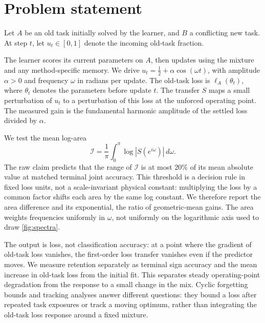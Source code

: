 \section{Problem statement}
\label{sec:problem}

Let \(A\) be an old task initially solved by the learner, and \(B\) a conflicting new task. At step \(t\), let \(u_t\in[0,1]\) denote the incoming old-task fraction.

The learner scores its current parameters on \(A\), then updates using the mixture and any method-specific memory. We drive \(u_t=\tfrac12+\alpha\cos(\omega t)\), with amplitude \(\alpha>0\) and frequency \(\omega\) in radians per update. The old-task loss is \(\ell_A(\theta_t)\), where \(\theta_t\) denotes the parameters before update \(t\). The transfer \(S\) maps a small perturbation of \(u_t\) to a perturbation of this loss at the unforced operating point. The measured gain is the fundamental harmonic amplitude of the settled loss divided by \(\alpha\).

We test the mean log-area
\begin{equation}
  \mathcal{I}=\frac{1}{\pi}\int_0^\pi \log |S(e^{i\omega})|\,d\omega.
  \label{eq:area}
\end{equation}
The raw claim predicts that the range of \(\mathcal I\) is at most 20\% of its mean absolute value at matched terminal joint accuracy. This threshold is a decision rule in fixed loss units, not a scale-invariant physical constant: multiplying the loss by a common factor shifts each area by the same log constant. We therefore report the area difference and its exponential, the ratio of geometric-mean gains. The area weights frequencies uniformly in \(\omega\), not uniformly on the logarithmic axis used to draw \cref{fig:spectra}.

The output is loss, not classification accuracy: at a point where the gradient of old-task loss vanishes, the first-order loss transfer vanishes even if the predictor moves. We measure retention separately as terminal sign accuracy and the mean increase in old-task loss from the initial fit. This separates steady operating-point degradation from the response to a small change in the mix. Cyclic forgetting bounds and tracking analyses answer different questions: they bound a loss after repeated task exposures or track a moving optimum, rather than integrating the old-task loss response around a fixed mixture.
